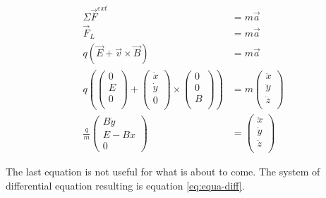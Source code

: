 \documentclass[a4paper,12pt,twoside]{article}
\begin{document}
\begin{align*}
	\Sigma\vec{F}^{ext} &= m\vec{a} \\
	\vec{F}_L &= m\vec{a}\\
	q(\vec{E} + \vec{v}\times\vec{B}) &= m\vec{a} \\
	q\left( \begin{pmatrix} 0\\ E\\ 0\\ \end{pmatrix} + \begin{pmatrix} \dot{x}\\ \dot{y}\\ 0\\ \end{pmatrix} \times \begin{pmatrix} 0\\ 0\\ B\\ \end{pmatrix}\right) &= m\begin{pmatrix} \ddot{x}\\ \ddot{y}\\ \ddot{z}\\ \end{pmatrix} \\
	\frac{q}{m}\begin{pmatrix} B\dot{y}\\ E - B\dot{x}\\ 0 \end{pmatrix} &= \begin{pmatrix} \ddot{x}\\ \ddot{y}\\ \ddot{z}\\ \end{pmatrix}
\end{align*}

The last equation is not useful for what is about to come.
The system of differential equation resulting is equation \ref{eq:equa-diff}.
\end{document}
